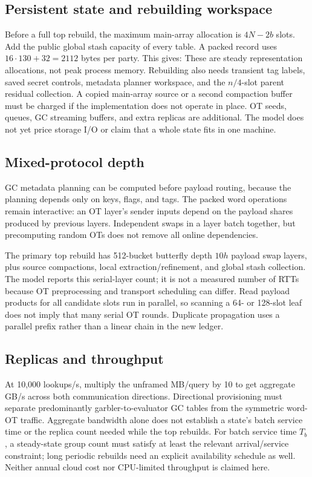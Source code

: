 \documentclass[11pt]{article}
\begin{document}
\subsection{Persistent state and rebuilding workspace}
Before a full top rebuild, the maximum main-array allocation is
$4N-2b$ slots. Add the public global stash capacity of every table. A
packed record uses $16\cdot130+32=2112$ bytes per party. This gives:
These are steady representation allocations, not peak process memory.
Rebuilding also needs transient tag labels, saved secret controls, metadata
planner workspace, and the $n/4$-slot parent residual collection. A copied
main-array source or a second compaction buffer must be charged if the
implementation does not operate in place. OT seeds, queues, GC streaming
buffers, and extra replicas are additional. The model does not yet price
storage I/O or claim that a whole state fits in one machine.

\subsection{Mixed-protocol depth}
GC metadata planning can be computed before payload routing, because the
planning depends only on keys, flags, and tags. The packed word operations
remain interactive: an OT layer's sender inputs depend on the payload
shares produced by previous layers. Independent swaps in a layer batch
together, but precomputing random OTs does not remove all online dependencies.

The primary top rebuild has 512-bucket butterfly depth $10h$ payload
swap layers, plus source compactions, local extraction/refinement, and
global stash collection. The model reports this serial-layer count; it is
not a measured number of RTTs because OT preprocessing and transport
scheduling can differ. Read payload products for all candidate slots run
in parallel, so scanning a 64- or 128-slot leaf does not imply that many
serial OT rounds. Duplicate propagation uses a parallel prefix rather
than a linear chain in the new ledger.

\subsection{Replicas and throughput}
At 10,000 lookups/s, multiply the unframed MB/query by 10 to get aggregate
GB/s across both communication directions. Directional provisioning must
separate predominantly garbler-to-evaluator GC tables from the symmetric
word-OT traffic. Aggregate bandwidth alone does not establish a state's
batch service time or the replica count needed while the top rebuilds.
For batch service time $T_b$, a steady-state group count must satisfy at
least the relevant arrival/service constraint; long periodic rebuilds need
an explicit availability schedule as well. Neither annual cloud cost nor
CPU-limited throughput is claimed here.
\end{document}
